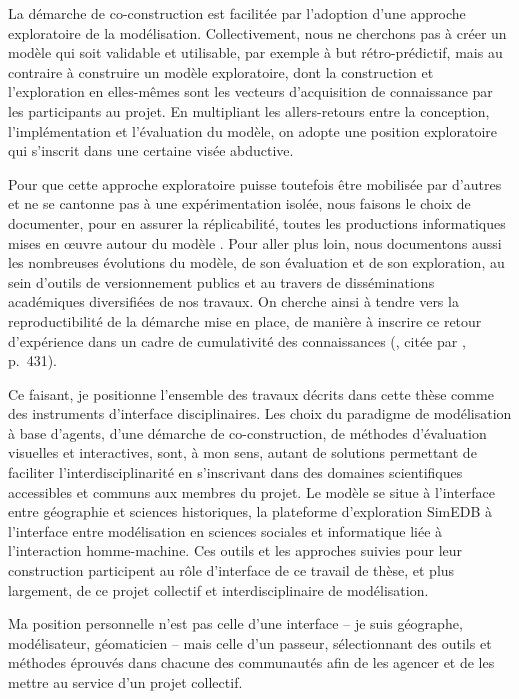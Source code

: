 La démarche de co-construction est facilitée par l'adoption d'une approche exploratoire de la modélisation.
Collectivement, nous ne cherchons pas à créer un modèle qui soit validable et utilisable, par exemple à but rétro-prédictif, mais au contraire à construire un modèle exploratoire, dont la construction et l'exploration en elles-mêmes sont les vecteurs d'acquisition de connaissance par les participants au projet.
En multipliant les allers-retours entre la conception, l'implémentation et l'évaluation du modèle, on adopte une position exploratoire qui s'inscrit dans une certaine visée abductive.

Pour que cette approche exploratoire puisse toutefois être mobilisée par d'autres et ne se cantonne pas à une expérimentation isolée, nous faisons le choix de documenter, pour en assurer la réplicabilité, toutes les productions informatiques mises en œuvre autour du modèle \simfeodal{}.
Pour aller plus loin, nous documentons aussi les nombreuses évolutions du modèle, de son évaluation et de son exploration, au sein d'outils de versionnement publics et au travers de disséminations académiques diversifiées de nos travaux.
On cherche ainsi à tendre vers la reproductibilité de la démarche mise en place, de manière à inscrire ce retour d'expérience dans un cadre de cumulativité des connaissances (\textcite{pumain_cumulativite_2005}, citée par \textcite{reycoyrehourcq:hal-01677950}, p.~431).

Ce faisant, je positionne l'ensemble des travaux décrits dans cette thèse comme des instruments d'interface disciplinaires.
Les choix du paradigme de modélisation à base d'agents, d'une démarche de co-construction, de méthodes d'évaluation visuelles et interactives, sont, à mon sens, autant de solutions permettant de faciliter l'interdisciplinarité en s'inscrivant dans des domaines scientifiques accessibles et communs aux membres du projet.
Le modèle \simfeodal{} se situe à l'interface entre géographie et sciences historiques, la plateforme d'exploration SimEDB à l'interface entre modélisation en sciences sociales et informatique liée à l'interaction homme-machine.
Ces outils et les approches suivies pour leur construction participent au rôle d'interface de ce travail de thèse, et plus largement, de ce projet collectif et interdisciplinaire de modélisation.

Ma position personnelle n'est pas celle d'une interface -- je suis géographe, modélisateur, géomaticien -- mais celle d'un passeur, sélectionnant des outils et méthodes éprouvés dans chacune des communautés afin de les agencer et de les mettre au service d'un projet collectif.